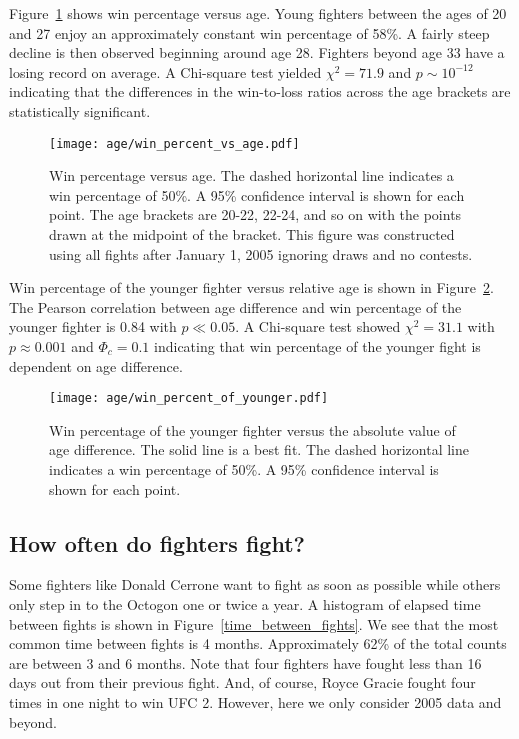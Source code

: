 \clearpage

Figure~\ref{win_pct_abs_age} shows win percentage versus age.
Young fighters between the ages of 20 and 27 enjoy an approximately constant win percentage
of 58\%. A fairly steep decline is then observed beginning around age 28.
Fighters beyond age 33 have a losing record on average.
A Chi-square test yielded $\chi^2=71.9$ and $p \sim 10^{-12}$ indicating that the differences
in the win-to-loss ratios across the age brackets are statistically
significant.

\begin{figure}[h]
\begin{center}
\texttt{[image: age/win\_percent\_vs\_age.pdf]}
\caption{Win percentage versus age. 
The dashed horizontal line indicates
a win percentage of 50\%. A 95\% confidence interval is shown for each point.
The age brackets are 20-22, 22-24, and so on with the points drawn at
the midpoint of the bracket.
This figure was constructed using all fights after January 1, 2005 ignoring
draws and no contests.}
\label{win_pct_abs_age}
\end{center}
\end{figure}

Win percentage of the younger fighter versus relative age
is shown in Figure~\ref{win_pct_rel_age}.
The Pearson correlation between age difference and win percentage of the
younger fighter is 0.84 with $p \ll 0.05$. A Chi-square
test showed $\chi^2=31.1$ with $p \approx 0.001$ and $\Phi_c=0.1$ indicating that win percentage
of the younger fight is dependent on age difference.

\begin{figure}[h]
\begin{center}
\texttt{[image: age/win\_percent\_of\_younger.pdf]}
\caption{Win percentage of the younger fighter versus the absolute
value of age difference. The
solid line is a best fit. The dashed horizontal line indicates
a win percentage of 50\%. A 95\% confidence interval is shown for each point.}
\label{win_pct_rel_age}
\end{center}
\end{figure}

\clearpage
\subsection*{How often do fighters fight?}

Some fighters like Donald Cerrone
want to fight as soon as possible while others only step
in to the Octogon one or twice a year. A histogram of elapsed time between fights
is shown in Figure~\ref{time_between_fights}. We see that the most
common time between fights is 4 months. 
Approximately 62\% of the total counts are between 3 and 6 months.
Note that four fighters have fought less than 16 days out from their
previous fight. And, of course, Royce Gracie fought four times in one night
to win UFC 2. However, here we only consider 2005 data and beyond.

